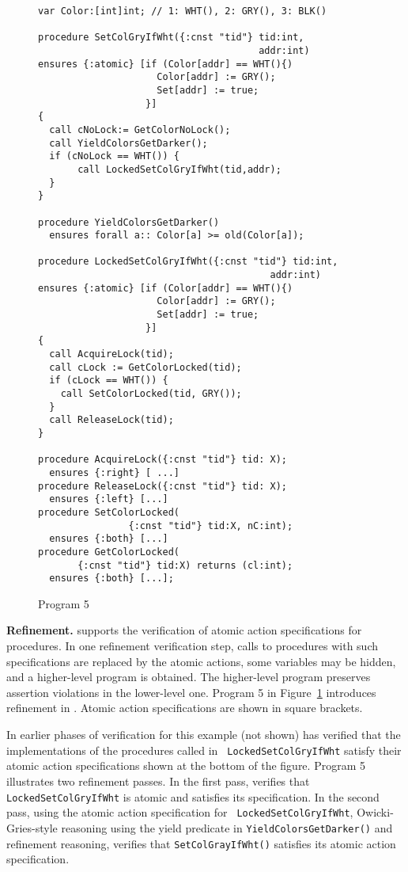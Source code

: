 \begin{figure}
\begin{verbatim}
var Color:[int]int; // 1: WHT(), 2: GRY(), 3: BLK()

procedure SetColGryIfWht({:cnst "tid"} tid:int,
                                       addr:int)
ensures {:atomic} [if (Color[addr] == WHT(){)
                     Color[addr] := GRY();
                     Set[addr] := true;
                   }]
{
  call cNoLock:= GetColorNoLock();
  call YieldColorsGetDarker();
  if (cNoLock == WHT()) {
       call LockedSetColGryIfWht(tid,addr);
  }
}

procedure YieldColorsGetDarker()
  ensures forall a:: Color[a] >= old(Color[a]);

procedure LockedSetColGryIfWht({:cnst "tid"} tid:int,
                                         addr:int)
ensures {:atomic} [if (Color[addr] == WHT(){)
                     Color[addr] := GRY();
                     Set[addr] := true;
                   }]
{
  call AcquireLock(tid);
  call cLock := GetColorLocked(tid);
  if (cLock == WHT()) {
    call SetColorLocked(tid, GRY());
  } 
  call ReleaseLock(tid);
}

procedure AcquireLock({:cnst "tid"} tid: X);
  ensures {:right} [ ...]
procedure ReleaseLock({:cnst "tid"} tid: X);
  ensures {:left} [...]
procedure SetColorLocked(
                {:cnst "tid"} tid:X, nC:int); 
  ensures {:both} [...]
procedure GetColorLocked(
       {:cnst "tid"} tid:X) returns (cl:int);
  ensures {:both} [...];

\end{verbatim}
\caption{Program 5}
\label{fig:reft}
\end{figure}

{\bf Refinement.} 
\civl supports the verification of atomic action specifications for
procedures. In one refinement verification step, calls to procedures with such
specifications are replaced by the atomic actions, some variables may
be hidden, and a higher-level program is obtained. The higher-level
program preserves assertion violations in the lower-level one. 
Program 5 in Figure~\ref{fig:reft} introduces refinement in \civl. 
Atomic action specifications are shown in square brackets. 

In earlier phases of verification for this example (not shown) \civl has verified that
the implementations of the procedures called in {\tt
  LockedSetColGryIfWht} satisfy their atomic action specifications shown
at the bottom of the figure. Program 5 illustrates two \civl
refinement passes. In the first pass, \civl verifies that {\tt
  LockedSetColGryIfWht} is atomic and satisfies its specification. In
the second pass, using the atomic action specification for {\tt
  LockedSetColGryIfWht}, Owicki-Gries-style reasoning using the yield
predicate in {\tt YieldColorsGetDarker()} and refinement reasoning,
\civl verifies that {\tt SetColGrayIfWht()} satisfies its atomic
action specification.

